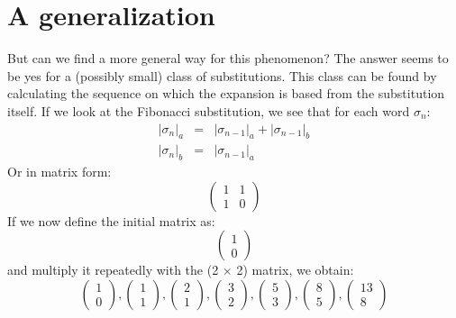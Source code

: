 \documentclass{article}
\begin{document}
\section*{A generalization}
But can we find a more general way for this phenomenon? The answer seems to
be yes for a (possibly small) class of substitutions. This class can be found
by calculating the sequence on which the expansion is based from the 
substitution itself. If we look at the Fibonacci substitution, we see that for
each word $\sigma_n$:
\begin{eqnarray*}
|\sigma_n|_a &=& |\sigma_{n - 1}|_a + |\sigma_{n - 1}|_b\\
|\sigma_n|_b &=& |\sigma_{n - 1}|_a
\end{eqnarray*}
Or in matrix form:
\begin{displaymath} \left( \begin{array}{cc}
1 & 1\\
1 & 0
\end{array} \right) \end{displaymath}
If we now define the initial matrix as:
\begin{displaymath} \left( \begin{array}{c}
1 \\
0 
\end{array} \right) \end{displaymath}
and multiply it repeatedly with the (2 $\times$ 2) matrix, we obtain:
\begin{displaymath} 
\left( \begin{array}{c}
1 \\
0 
\end{array} \right),
\left( \begin{array}{c}
1 \\
1 
\end{array} \right),
\left( \begin{array}{c}
2 \\
1 
\end{array} \right),
\left( \begin{array}{c}
3 \\
2 
\end{array} \right),
\left( \begin{array}{c}
5 \\
3 
\end{array} \right),
\left( \begin{array}{c}
8 \\
5 
\end{array} \right),
\left( \begin{array}{c}
13 \\
8 
\end{array} \right)
\end{displaymath}
\end{document}
